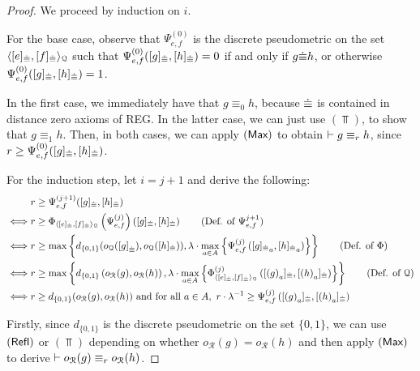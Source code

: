 \begin{proof}

We proceed by induction on $i$. 

For the base case, observe that ${\Psi}_{e,f}^{(0)}$ is the discrete pseudometric on the set $\langle [e]_{{\mathrel{\dot\equiv}}},[f]_{{\mathrel{\dot\equiv}}} \rangle_{\mathcal{Q}}$ such that ${\Psi}_{e,f}^{(0)}([g]_{{\mathrel{\dot\equiv}}}, [h]_{{\mathrel{\dot\equiv}}})=0$ if and only if ${{g} {\mathrel{\dot\equiv}} {h}}$, or otherwise ${\Psi}_{e,f}^{(0)}([g]_{{\mathrel{\dot\equiv}}}, [h]_{{\mathrel{\dot\equiv}}})=1$. 

In the first case, we immediately have that $g \equiv_0 h$, because ${\mathrel{\dot\equiv}}$ is contained in distance zero axioms of \textsf{REG}. In the latter case, we can just use $(\Top)$, to show that $g \equiv_1 h $. Then, in both cases, we can apply $(\textsf{Max})$ to obtain $\vdash g \equiv_{r} h$, since $r \geq {\Psi}_{e,f}^{(0)}([g]_{{\mathrel{\dot\equiv}}}, [h]_{{\mathrel{\dot\equiv}}})$.
	
For the induction step, let $i = j + 1$ and derive the following:
\begin{align*}
    &\e \geq {\Psi}_{e,f}^{(j + 1)}([g]_{\acirel}, [h]_{\acirel})\\
    \iff &\e \geq \Phi_{\gen{[e]_{\acirel},[f]_{\acirel}}{\mathcal{Q}}} \left( {\Psi}_{e,f}^{(j)} \right)\left([g]_{\acirel}, [h]_{\acirel}\right) \tag{Def. of ${\Psi}_{e,f}^{j+1}$}\\
    \iff &\e \geq \max\left\{ d_{\{0,1\}} (o_{\mathcal{Q}}({[g]}_{\acirel}), o_{\mathcal{Q}}([h]_{\acirel})), \lambda \cdot \max_{a \in \alphabet} \left\{ {\Psi}_{e,f}^{(j)}\left({[g]_{\acirel}}_a, {[h]_{\acirel}}_{a}\right) \right\}\right\} \tag{Def. of $\Phi$}\\
    \iff &\e \geq \max\left\{ d_{\{0,1\}} \left(o_{\mathcal{R}}(g), o_{\mathcal{R}}(h)\right), \lambda \cdot \max_{a \in \alphabet} \left\{ \Phi_{\gen{[e]_{\acirel},[f]_{\acirel}}{\mathcal{Q}}}^{(j)}\left({[{(g)}_{a}]_{\acirel}}, {[{(h)}_{a}]_{\acirel}}\right) \right\}\right\} \tag{Def. of $\mathcal{Q}$}\\
    \iff &{\e \geq d_{\{0,1\}} (o_{\mathcal{R}}(g), o_{\mathcal{R}}(h))} \text{ and for all $a \in \alphabet$},~\e \cdot \lambda^{-1} \geq {\Psi}_{e,f}^{(j)}\left({[{(g)}_{a}]_{\acirel}}, {[{(h)}_{a}]_{\acirel}}\right)
\end{align*}

Firstly, since $d_{\{0,1\}}$ is the discrete pseudometric on the set $\{0,1\}$, we can use $(\textsf{Refl})$ or $(\Top)$ depending on whether $o_{\mathcal{R}}(g) = o_{\mathcal{R}}(h)$ and then apply $(\textsf{Max})$ to derive $\vdash o_{\mathcal{R}}(g) \equiv_r o_{\mathcal{R}}(h)$. 


\end{proof}
